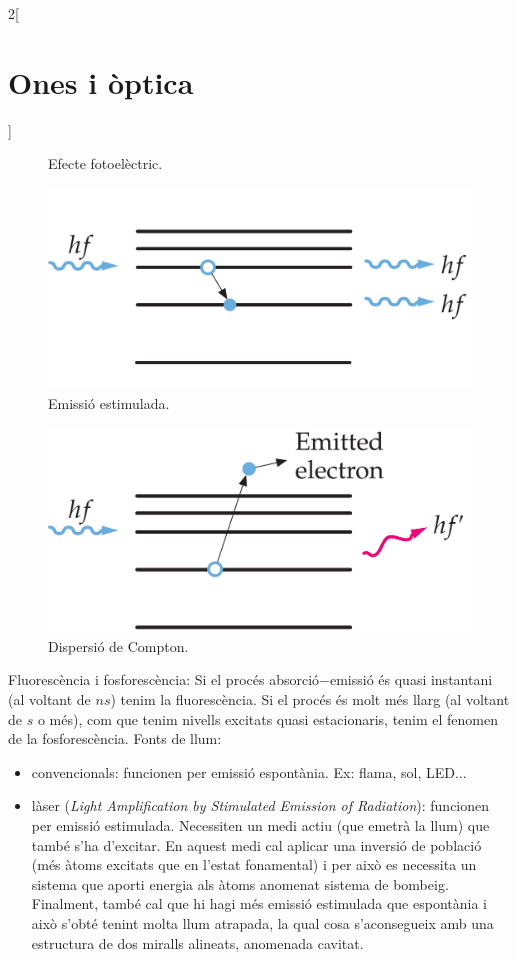 \documentclass[class=article,10pt,crop=false]{standalone}
\begin{document}
\begin{multicols}{2}[\section{Ones i òptica}]
\begin{figure}[ht]
    \caption{Efecte fo\-toe\-lèc\-tric.}   
\end{figure}
\begin{figure}[ht]
    \includegraphics[width=\linewidth]{Physics/1st/Ones_i_optica/Imatges/stimulated.jpg}
    \caption{Emissió es\-ti\-mu\-la\-da.}
\end{figure}
\begin{figure}[ht]
    \includegraphics[width=\linewidth]{Physics/1st/Ones_i_optica/Imatges/compton.jpg} 
    \caption{Dispersió de Compton.}   
\end{figure}
Fluorescència i fosforescència: Si el procés absorció$-$emissió és quasi instantani (al vol\-tant de $ns$) tenim la fluorescència. Si el procés és molt més llarg (al voltant de $s$ o més), com que tenim nivells excitats quasi estacionaris, tenim el fenomen de la fosforescència.\newline
Fonts de llum:
\begin{itemize}
    \item convencionals: funcionen per emissió espontània. Ex: flama, sol, LED...
    \item làser (\textit{Light Amplification by Stimulated Emission of Radiation}): funcionen per emissió estimulada. Ne\-ces\-si\-ten un medi actiu (que emetrà la llum) que també s’ha d’excitar. En a\-quest medi cal aplicar una inversió de població (més àtoms excitats que en l’estat fonamental) i per això es necessita un sistema que aporti energia als àtoms anomenat sistema de bombeig. Finalment, també cal que hi hagi més emissió estimulada que espontània i això s’obté tenint molta llum atrapada, la qual cosa s’aconsegueix amb una estructura de dos miralls a\-li\-ne\-ats, a\-no\-me\-na\-da cavitat.

\end{itemize}
\end{multicols}
\end{document}
